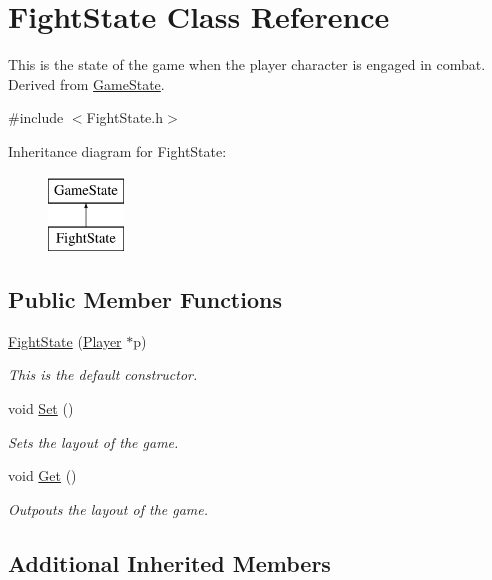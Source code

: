 \hypertarget{classFightState}{\section{Fight\-State Class Reference}
\label{classFightState}
}


This is the state of the game when the player character is engaged in combat. Derived from \hyperlink{classGameState}{Game\-State}.  




{\ttfamily \#include $<$Fight\-State.\-h$>$}

Inheritance diagram for Fight\-State\-:\begin{figure}[H]
\begin{center}
\leavevmode
\includegraphics[height=2.000000cm]{classFightState}
\end{center}
\end{figure}
\subsection*{Public Member Functions}
\begin{DoxyCompactItemize}
\item 
\hyperlink{classFightState_ad63750cbcb525bf104bce58bc6c4e343}{Fight\-State} (\hyperlink{classPlayer}{Player} $\ast$p)
\begin{DoxyCompactList}\small\item\em This is the default constructor. \end{DoxyCompactList}\item 
void \hyperlink{classFightState_a853f6d2a9caf7343b8d75165e44bf5c1}{Set} ()
\begin{DoxyCompactList}\small\item\em Sets the layout of the game. \end{DoxyCompactList}\item 
void \hyperlink{classFightState_afeff88d0e0c0fa25049e2152190429ed}{Get} ()
\begin{DoxyCompactList}\small\item\em Outpouts the layout of the game. \end{DoxyCompactList}\end{DoxyCompactItemize}
\subsection*{Additional Inherited Members}


